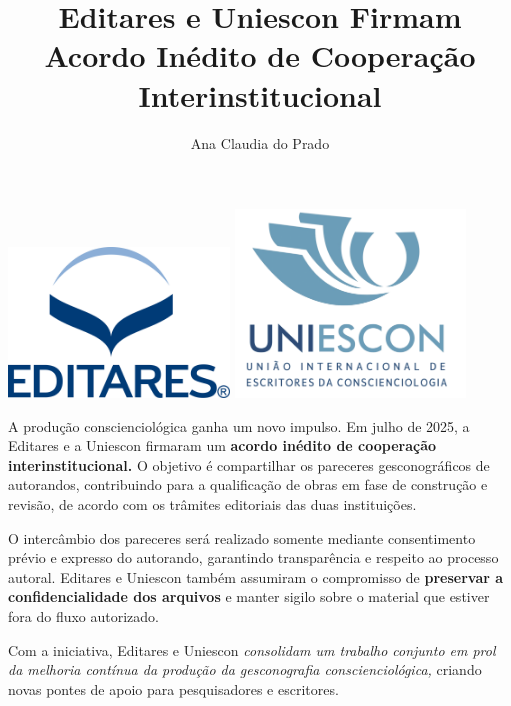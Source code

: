 \documentclass{gescons}
\author{Ana Claudia do Prado}
\title{Editares e Uniescon Firmam Acordo Inédito de Cooperação Interinstitucional}
\begin{document}
    \makeentrevistatitle


    
    
\begin{center}
    \includegraphics[height=4cm]{images/Logo-Editares-com-Marca-Registrada.png}
    \hspace{3cm}
    \includegraphics[height=5cm]{images/Logo-UNIESCON-2048x1741.png} 
    
\end{center}
    
    \begin{multicols}{2}

A produção conscienciológica ganha um novo impulso. Em julho de 2025, a Editares e a Uniescon firmaram um \textbf{acordo inédito de cooperação interinstitucional.} O objetivo é compartilhar os pareceres gesconográficos de autorandos, contribuindo para a qualificação de obras em fase de construção e revisão, de acordo com os trâmites editoriais das duas instituições.

O intercâmbio dos pareceres será realizado somente mediante consentimento prévio e expresso do autorando, garantindo transparência e respeito ao processo autoral. Editares e Uniescon também assumiram o compromisso de \textbf{preservar a confidencialidade dos arquivos} e manter sigilo sobre o material que estiver fora do fluxo autorizado.

Com a iniciativa, Editares e Uniescon \emph{consolidam um trabalho conjunto em prol da melhoria contínua da produção da gesconografia conscienciológica,} criando novas pontes de apoio para pesquisadores e escritores.



    \end{multicols}
\end{document}
